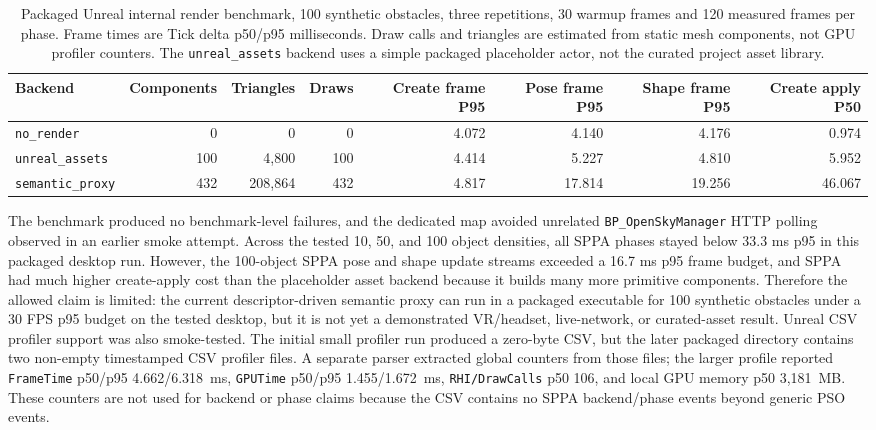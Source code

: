 ﻿\documentclass[11pt,a4paper]{article}
\begin{document}
\begin{table}[h]
\centering
\scriptsize
\setlength{\tabcolsep}{3pt}
\caption{Packaged Unreal internal render benchmark, 100 synthetic obstacles,
three repetitions, 30 warmup frames and 120 measured frames per phase. Frame
times are Tick delta p50/p95 milliseconds. Draw calls and triangles are
estimated from static mesh components, not GPU profiler counters. The
\texttt{unreal\_assets} backend uses a simple packaged placeholder actor, not
the curated project asset library.}
\label{tab:packaged-render-benchmark}
\begin{tabular}{@{}lrrrrrrr@{}}
\toprule
Backend & Components & Triangles & Draws & Create frame P95 & Pose frame P95 & Shape frame P95 & Create apply P50 \\
\midrule
\texttt{no\_render} & 0 & 0 & 0 & 4.072 & 4.140 & 4.176 & 0.974 \\
\texttt{unreal\_assets} & 100 & 4,800 & 100 & 4.414 & 5.227 & 4.810 & 5.952 \\
\texttt{semantic\_proxy} & 432 & 208,864 & 432 & 4.817 & 17.814 & 19.256 & 46.067 \\
\bottomrule
\end{tabular}
\end{table}

The benchmark produced no benchmark-level failures, and the dedicated map
avoided unrelated \texttt{BP\_OpenSkyManager} HTTP polling observed in an
earlier smoke attempt. Across the tested 10, 50, and 100 object densities, all
SPPA phases stayed below 33.3 ms p95 in this packaged desktop run. However, the
100-object SPPA pose and shape update streams exceeded a 16.7 ms p95 frame
budget, and SPPA had much higher create-apply cost than the placeholder asset
backend because it builds many more primitive components. Therefore the allowed
claim is limited: the current descriptor-driven semantic proxy can run in a
packaged executable for 100 synthetic obstacles under a 30 FPS p95 budget on
the tested desktop, but it is not yet a demonstrated VR/headset, live-network,
or curated-asset result. Unreal CSV profiler support was also smoke-tested. The
initial small profiler run produced a zero-byte CSV, but the later packaged
directory contains two non-empty timestamped CSV profiler files. A separate
parser extracted global counters from those files; the larger profile reported
\texttt{FrameTime} p50/p95 4.662/6.318~ms, \texttt{GPUTime} p50/p95
1.455/1.672~ms, \texttt{RHI/DrawCalls} p50 106, and local GPU memory p50
3,181~MB. These counters are not used for backend or phase claims because the
CSV contains no SPPA backend/phase events beyond generic PSO events.
\end{document}
